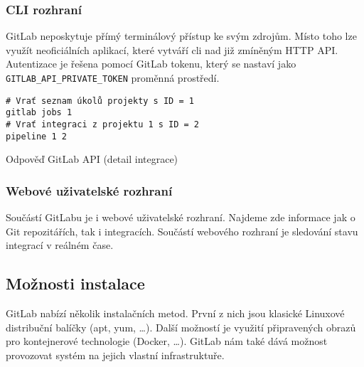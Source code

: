 \subsubsection{CLI rozhraní}

GitLab neposkytuje přímý terminálový přístup ke svým zdrojům.
Místo toho lze využít neoficiálních aplikací, které vytváří cli  nad již zmíněným HTTP API.
Autentizace je řešena pomocí GitLab tokenu, který se nastaví jako \verb|GITLAB_API_PRIVATE_TOKEN| proměnná prostředí.


\begin{listing}[ht]
\begin{verbatim}
# Vrať seznam úkolů projekty s ID = 1
gitlab jobs 1
# Vrať integraci z projektu 1 s ID = 2
pipeline 1 2
\end{verbatim}
\label{code:gitlab-api}
\caption{Odpověď GitLab API (detail integrace)}
\end{listing}

\subsubsection{Webové uživatelské rozhraní}

Součástí GitLabu je i webové uživatelské rozhraní.
Najdeme zde informace jak o Git repozitářích, tak i integracích.
Součástí webového rozhraní je sledování stavu integrací v reálném čase.


\subsection{Možnosti instalace}

GitLab nabízí několik instalačních metod.
První z nich jsou klasické Linuxové distribuční balíčky (apt, yum, \ldots).
Další možností je využití připravených obrazů pro kontejnerové technologie (Docker, \ldots).
GitLab nám také dává možnost provozovat systém na jejich vlastní infrastruktuře.

